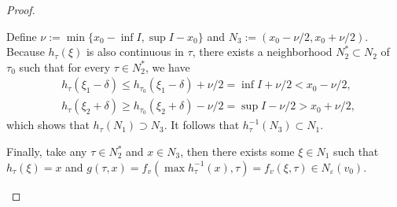 \documentclass[a4paper]{article}
\theoremstyle{definition}
\theoremstyle{plain}
\begin{document}
\begin{proof}
\begin{outline}
  \1 Define $\nu := \min \{ x_{0} - \inf I, \sup I - x_{0}\}$ and
  $N_{3} := (x_{0} - \nu / 2, x_{0} + \nu / 2)$. Because $h_{\tau}(\xi)$ is also
  continuous in $\tau$, there exists a neighborhood $N_{2}^{*} \subset N_{2}$ of
  $\tau_{0}$ such that for every $\tau \in N_{2}^{*}$, we have
  \begin{align*}
  &h_{\tau}(\xi_{1} - \delta) \leq h_{\tau_{0}}(\xi_{1} - \delta) + \nu/2 = \inf I + \nu /2 < x_{0} - \nu/2 , \\
  &h_{\tau}(\xi_{2} + \delta) \geq h_{\tau_{0}}(\xi_{2} + \delta) - \nu/2 = \sup I - \nu /2 > x_{0} + \nu/2 ,
  \end{align*}
  which shows that $h_{\tau}(N_{1}) \supset N_{3}$. It follows that
  $h_{\tau}^{-1}(N_{3}) \subset N_{1}$.

  \1 Finally, take any $\tau \in N_{2}^{*}$ and $x \in N_{3}$, then there exists
  some $\xi \in N_{1}$ such that $h_{\tau}(\xi) = x$ and
  $g(\tau, x) = f_{v}(\max h_{\tau}^{-1}(x), \tau) = f_{v}(\xi, \tau) \in N_{\varepsilon}(v_{0})$.
  \qedhere
\end{outline}
\end{proof}
\end{document}
